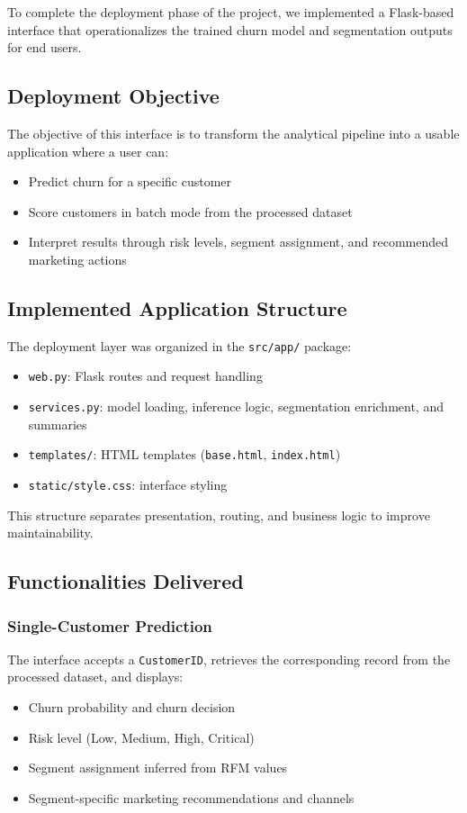 \documentclass[12pt,a4paper]{article}
\begin{document}
To complete the deployment phase of the project, we implemented a Flask-based interface that operationalizes the trained churn model and segmentation outputs for end users.

\subsection{Deployment Objective}

The objective of this interface is to transform the analytical pipeline into a usable application where a user can:
\begin{itemize}
    \item Predict churn for a specific customer
    \item Score customers in batch mode from the processed dataset
    \item Interpret results through risk levels, segment assignment, and recommended marketing actions
\end{itemize}

\subsection{Implemented Application Structure}

The deployment layer was organized in the \texttt{src/app/} package:
\begin{itemize}
    \item \texttt{web.py}: Flask routes and request handling
    \item \texttt{services.py}: model loading, inference logic, segmentation enrichment, and summaries
    \item \texttt{templates/}: HTML templates (\texttt{base.html}, \texttt{index.html})
    \item \texttt{static/style.css}: interface styling
\end{itemize}

This structure separates presentation, routing, and business logic to improve maintainability.

\subsection{Functionalities Delivered}

\subsubsection{Single-Customer Prediction}
The interface accepts a \texttt{CustomerID}, retrieves the corresponding record from the processed dataset, and displays:
\begin{itemize}
    \item Churn probability and churn decision
    \item Risk level (Low, Medium, High, Critical)
    \item Segment assignment inferred from RFM values
    \item Segment-specific marketing recommendations and channels
\end{itemize}
\end{document}
